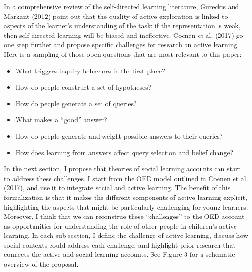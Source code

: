 \documentclass[english,floatsintext,man]{apa6}
\providecommand{\tightlist}{%
  \setlength{\itemsep}{0pt}\setlength{\parskip}{0pt}}
\theoremstyle{definition}
\theoremstyle{definition}
\theoremstyle{definition}
\theoremstyle{remark}
\begin{document}
In a comprehensive review of the self-directed learning literature,
Gureckis and Markant (2012) point out that the quality of active
exploration is linked to aspects of the learner's understanding of the
task: if the representation is weak, then self-directed learning will be
biased and ineffective. Coenen et al. (2017) go one step further and
propose specific challenges for research on active learning. Here is a
sampling of those open questions that are most relevant to this paper:

\begin{itemize}
\tightlist
\item
  What triggers inquiry behaviors in the first place?
\item
  How do people construct a set of hypotheses?
\item
  How do people generate a set of queries?
\item
  What makes a \enquote{good} answer?
\item
  How do people generate and weight possible answers to their queries?
\item
  How does learning from answers affect query selection and belief
  change?
\end{itemize}

\noindent
In the next section, I propose that theories of social learning accounts
can start to address these challenges. I start from the OED model
outlined in Coenen et al. (2017), and use it to integrate social and
active learning. The benefit of this formalization is that it makes the
different components of active learning explicit, highlighting the
aspects that might be particularly challenging for young learners.
Moreover, I think that we can reconstrue these \enquote{challenges} to
the OED account as opportunities for understanding the role of other
people in children's active learning. In each sub-section, I define the
challenge of active learning, discuss how social contexts could address
each challenge, and highlight prior research that connects the active
and social learning accounts. See Figure 3 for a schematic overview of
the proposal.
\end{document}
